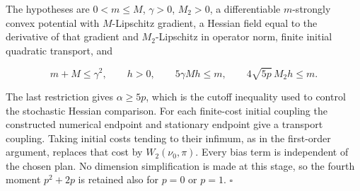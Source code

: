 \documentclass[11pt,a4paper]{article}
\begin{document}
The hypotheses are \(0<m\le M\), \(\gamma>0\), \(M_2>0\), a differentiable \(m\)-strongly convex potential with \(M\)-Lipschitz gradient, a Hessian field equal to the derivative of that gradient and \(M_2\)-Lipschitz in operator norm, finite initial quadratic transport, and

\[m+M\le\gamma^2,\qquad h>0,\qquad5\gamma Mh\le m,\qquad4\sqrt{5p}\,M_2h\le m.\]

The last restriction gives \(\alpha\ge5p\), which is the cutoff inequality used to control the stochastic Hessian comparison. For each finite-cost initial coupling the constructed numerical endpoint and stationary endpoint give a transport coupling. Taking initial costs tending to their infimum, as in the first-order argument, replaces that cost by \(W_2(\nu_0,\pi)\). Every bias term is independent of the chosen plan. No dimension simplification is made at this stage, so the fourth moment \(p^2+2p\) is retained also for \(p=0\) or \(p=1\). \(\square\)
\end{document}
